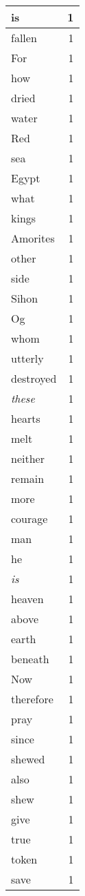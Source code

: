 \begin{center}
\begin{longtable}{l|r}
is & 1 \\ \hline
fallen & 1 \\ \hline
For & 1 \\ \hline
how & 1 \\ \hline
dried & 1 \\ \hline
water & 1 \\ \hline
Red & 1 \\ \hline
sea & 1 \\ \hline
Egypt & 1 \\ \hline
what & 1 \\ \hline
kings & 1 \\ \hline
Amorites & 1 \\ \hline
other & 1 \\ \hline
side & 1 \\ \hline
Sihon & 1 \\ \hline
Og & 1 \\ \hline
whom & 1 \\ \hline
utterly & 1 \\ \hline
destroyed & 1 \\ \hline
\emph{these} & 1 \\ \hline
hearts & 1 \\ \hline
melt & 1 \\ \hline
neither & 1 \\ \hline
remain & 1 \\ \hline
more & 1 \\ \hline
courage & 1 \\ \hline
man & 1 \\ \hline
he & 1 \\ \hline
\emph{is} & 1 \\ \hline
heaven & 1 \\ \hline
above & 1 \\ \hline
earth & 1 \\ \hline
beneath & 1 \\ \hline
Now & 1 \\ \hline
therefore & 1 \\ \hline
pray & 1 \\ \hline
since & 1 \\ \hline
shewed & 1 \\ \hline
also & 1 \\ \hline
shew & 1 \\ \hline
give & 1 \\ \hline
true & 1 \\ \hline
token & 1 \\ \hline
save & 1 \\ \hline

\end{longtable}
\end{center}
